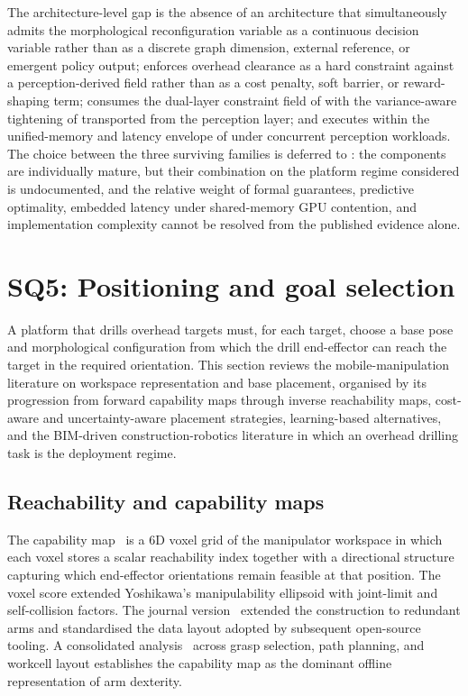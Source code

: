 \documentclass[11pt,a4paper]{article}
\begin{document}
The architecture-level gap is the absence of an architecture that simultaneously admits the morphological reconfiguration variable as a continuous decision variable rather than as a discrete graph dimension, external reference, or emergent policy output; enforces overhead clearance as a hard constraint against a perception-derived field rather than as a cost penalty, soft barrier, or reward-shaping term; consumes the dual-layer constraint field of  with the variance-aware tightening of  transported from the perception layer; and executes within the unified-memory and latency envelope of  under concurrent perception workloads. The choice between the three surviving families is deferred to : the components are individually mature, but their combination on the platform regime considered is undocumented, and the relative weight of formal guarantees, predictive optimality, embedded latency under shared-memory GPU contention, and implementation complexity cannot be resolved from the published evidence alone.

\section{SQ5: Positioning and goal selection}
\label{sec:sq5}

A platform that drills overhead targets must, for each target, choose a base pose and morphological configuration from which the drill end-effector can reach the target in the required orientation. This section reviews the mobile-manipulation literature on workspace representation and base placement, organised by its progression from forward capability maps through inverse reachability maps, cost-aware and uncertainty-aware placement strategies, learning-based alternatives, and the BIM-driven construction-robotics literature in which an overhead drilling task is the deployment regime.

\subsection{Reachability and capability maps}

The capability map~\parencite{zacharias2007capturing} is a 6D voxel grid of the manipulator workspace in which each voxel stores a scalar reachability index together with a directional structure capturing which end-effector orientations remain feasible at that position. The voxel score extended Yoshikawa's manipulability ellipsoid with joint-limit and self-collision factors. The journal version~\parencite{zacharias2013capability} extended the construction to redundant arms and standardised the data layout adopted by subsequent open-source tooling. A consolidated analysis~\parencite{ReachabilityCapabilityAnalysis2025} across grasp selection, path planning, and workcell layout establishes the capability map as the dominant offline representation of arm dexterity.
\end{document}

